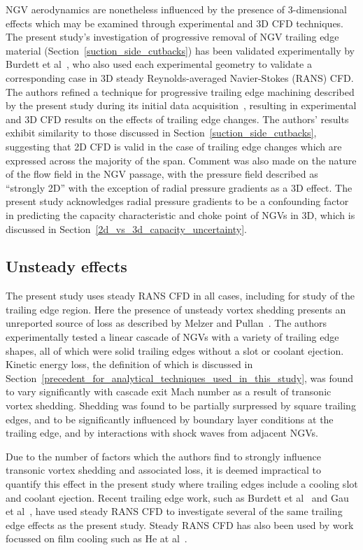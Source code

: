 \documentclass[a4paper, 11pt, oneside]{report}
\begin{document}
NGV aerodynamics are nonetheless influenced by the presence of 3-dimensional effects which may be examined through experimental and 3D CFD techniques. The present study's investigation of progressive removal of NGV trailing edge material (Section~\ref{suction_side_cutbacks}) has been validated experimentally by Burdett et al~\cite{burdett_capacity}, who also used each experimental geometry to validate a corresponding case in 3D steady Reynolds-averaged Navier-Stokes (RANS) CFD. The authors refined a technique for progressive trailing edge machining described by the present study during its initial data acquisition~\cite{gammage_trailing_edge_machining}, resulting in experimental and 3D CFD results on the effects of trailing edge changes. The authors' results exhibit similarity to those discussed in Section~\ref{suction_side_cutbacks}, suggesting that 2D CFD is valid in the case of trailing edge changes which are expressed across the majority of the span. Comment was also made on the nature of the flow field in the NGV passage, with the pressure field described as ``strongly 2D'' with the exception of radial pressure gradients as a 3D effect. The present study acknowledges radial pressure gradients to be a confounding factor in predicting the capacity characteristic and choke point of NGVs in 3D, which is discussed in Section~\ref{2d_vs_3d_capacity_uncertainty}.

\subsection{Unsteady effects}

The present study uses steady RANS CFD in all cases, including for study of the trailing edge region. Here the presence of unsteady vortex shedding presents an unreported source of loss as described by Melzer and Pullan~\cite{melzer_vortex_shedding}. The authors experimentally tested a linear cascade of NGVs with a variety of trailing edge shapes, all of which were solid trailing edges without a slot or coolant ejection. Kinetic energy loss, the definition of which is discussed in Section~\ref{precedent_for_analytical_techniques_used_in_this_study}, was found to vary significantly with cascade exit Mach number as a result of transonic vortex shedding. Shedding was found to be partially surpressed by square trailing edges, and to be significantly influenced by boundary layer conditions at the trailing edge, and by interactions with shock waves from adjacent NGVs. 

Due to the number of factors which the authors find to strongly influence transonic vortex shedding and associated loss, it is deemed impractical to quantify this effect in the present study where trailing edges include a cooling slot and coolant ejection. Recent trailing edge work, such as Burdett et al~\cite{burdett_capacity} and Gau et al~\cite{gao_te}, have used steady RANS CFD to investigate several of the same trailing edge effects as the present study. Steady RANS CFD has also been used by work focussed on film cooling such as He at al~\cite{he_film_cooling}.
\end{document}
